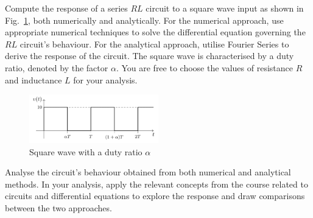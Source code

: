 Compute the response of a series $RL$ circuit to a square wave input as shown in Fig.~\ref{input_wave}, both numerically and analytically. For the numerical approach, use appropriate numerical techniques to solve the differential equation governing the $RL$ circuit's behaviour. For the analytical approach, utilise Fourier Series to derive the response of the circuit. The square wave is characterised by a duty ratio, denoted by the factor $\alpha$. You are free to choose the values of resistance $R$ and inductance $L$ for your analysis.

\begin{figure}[H]
  \centering
  \includegraphics[width=0.5\textwidth]{input_wave.png}
  \caption{Square wave with a duty ratio $\alpha$}
  \label{input_wave}
\end{figure}

Analyse the circuit's behaviour obtained from both numerical and analytical methods. In your analysis, apply the relevant concepts from the course related to circuits and differential equations to explore the response and draw comparisons between the two approaches.
